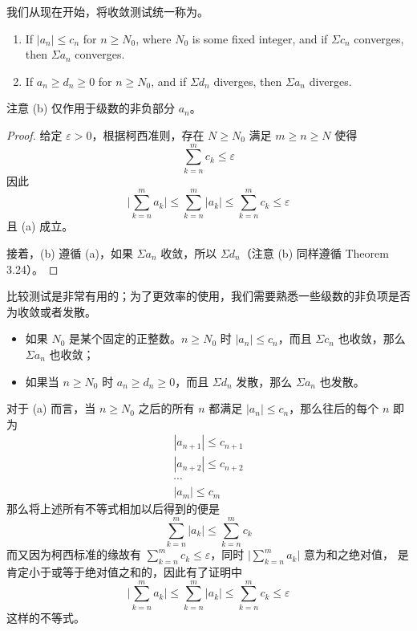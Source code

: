 \documentclass[../poma-notes.tex]{subfiles}
\begin{document}
我们从现在开始，将收敛测试统一称为。

\begin{theorem}\mbox{}\par
  \begin{enumerate}[label=(\alph*)]
    \item If $|a_n| \le c_n$ for $n \ge N_0$, where $N_0$ is some fixed integer, and if $\Sigma c_n$ converges,
          then $\Sigma a_n$ converges.
    \item If $a_n \ge d_n \ge 0$ for $n \ge N_0$, and if $\Sigma d_n$ diverges, then $\Sigma a_n$ diverges.
  \end{enumerate}
\end{theorem}

注意 (b) 仅作用于级数的非负部分 $a_n$。

\begin{proof}
  给定 $\varepsilon > 0$，根据柯西准则，存在 $N \ge N_0$ 满足 $m \ge n \ge N$ 使得
  \[ \sum_{k=n}^{m} c_k \le \varepsilon \]
  因此
  \[ \Bigg| \sum_{k=n}^{m} a_k \Bigg| \le \sum_{k=n}^{m} |a_k| \le \sum_{k=n}^{m} c_k \le \varepsilon \]
  且 (a) 成立。

  接着，(b) 遵循 (a)，如果 $\Sigma a_n$ 收敛，所以 $\Sigma d_n$（注意 (b) 同样遵循 Theorem 3.24）。
\end{proof}

比较测试是非常有用的；为了更效率的使用，我们需要熟悉一些级数的非负项是否为收敛或者发散。

\newpage
\begin{anote}\mbox{}\par
  \begin{itemize}
    \item 如果 $N_0$ 是某个固定的正整数。$n \ge N_0$ 时 $|a_n| \le c_n$，而且 $\Sigma c_n$ 也收敛，那么 $\Sigma a_n$ 也收敛；
    \item 如果当 $n \ge N_0$ 时 $a_n \ge d_n \ge 0$，而且 $\Sigma d_n$ 发散，那么 $\Sigma a_n$ 也发散。
  \end{itemize}

  对于 (a) 而言，当 $n \ge N_0$ 之后的所有 $n$ 都满足 $|a_n| \le c_n$，那么往后的每个 $n$ 即为
  \begin{gather*}
    |a_{n+1}| \le c_{n+1} \\
    |a_{n+2}| \le c_{n+2} \\
    \cdots \\
    |a_{m}| \le c_{m}
  \end{gather*}
  那么将上述所有不等式相加以后得到的便是
  \[ \sum_{k=n}^{m} |a_k| \le \sum_{k=n}^{m} c_k \]
  而又因为柯西标准的缘故有 $\sum_{k=n}^{m} c_k \le \varepsilon$，同时 $\Bigg| \sum_{k=n}^{m} a_k \Bigg|$ 意为和之绝对值，
  是肯定小于或等于绝对值之和的，因此有了证明中
  \[ \Bigg| \sum_{k=n}^{m} a_k \Bigg| \le \sum_{k=n}^{m} |a_k| \le \sum_{k=n}^{m} c_k \le \varepsilon \]
  这样的不等式。
\end{anote}
\end{document}
